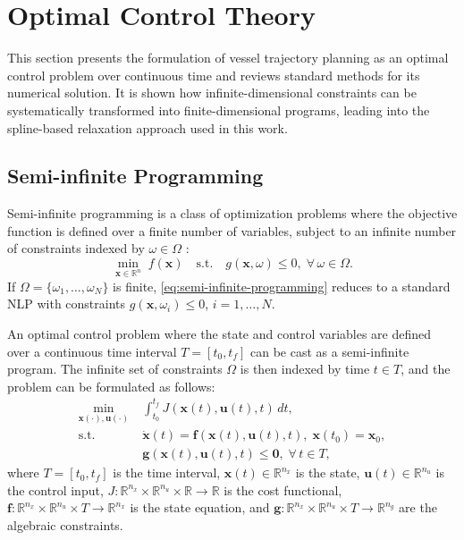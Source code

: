 


\section{Optimal Control Theory}
This section presents the formulation of vessel trajectory planning as an optimal control problem over continuous time and reviews standard methods for its numerical solution. It is shown how infinite-dimensional constraints can be systematically transformed into finite-dimensional programs, leading into the spline-based relaxation approach used in this work.


\subsection{Semi-infinite Programming}\label{sec:semi-infinite-programming}

Semi-infinite programming is a class of optimization problems where the objective function is defined over a finite number of variables, subject to an infinite number of constraints  indexed by $\omega\in\Omega$ \citep{Bonnans2013-gt}:
\begin{equation}\label{eq:semi-infinite-programming}
  \min_{\mathbf x\in\mathbb R^n}\; f(\mathbf x)
  \quad\text{s.t.}\quad g(\mathbf x,\omega)\le0,\;\forall\,\omega\in\Omega.
\end{equation}
If $\Omega=\{\omega_1,\dots,\omega_N\}$ is finite, \eqref{eq:semi-infinite-programming} reduces to a standard \acrfull{NLP} with constraints $g(\mathbf x,\omega_i)\le0$, $i=1,\dots,N$.

An optimal control problem where the state and control variables are defined over a continuous time interval $T=[t_0,t_f]$ can be cast as a semi-infinite program.  The infinite set of constraints $\Omega$ is then indexed by time $t\in T$, and the problem can be formulated as follows:
\begin{equation}\label{eq:optimal-control-problem}
  \begin{aligned}
    \min_{\mathbf{x}(\cdot),\mathbf{u}(\cdot)}\;&\int_{t_0}^{t_f}J(\mathbf x(t),\mathbf u(t),t)\,dt,\\
    \text{s.t.}\;&\dot{\mathbf x}(t)=\mathbf f(\mathbf x(t),\mathbf u(t),t),\;\mathbf x(t_0)=\mathbf x_0,\\
                &\mathbf g(\mathbf x(t),\mathbf u(t),t)\le\mathbf 0,\;\forall\,t\in T,
  \end{aligned}
\end{equation}
where $T = [t_0, t_f]$ is the time interval, $\mathbf{x}(t) \in \mathbb R^{n_x}$ is the state, $\mathbf{u}(t) \in \mathbb R^{n_u}$ is the control input, $J : \mathbb R^{n_x} \times \mathbb R^{n_u} \times \mathbb R \to \mathbb R$ is the cost functional, $\mathbf f : \mathbb R^{n_x} \times \mathbb R^{n_u} \times T \to \mathbb R^{n_x}$ is the state equation, and $\mathbf g : \mathbb R^{n_x} \times \mathbb R^{n_u} \times T \to \mathbb R^{n_g}$ are the algebraic constraints. 


